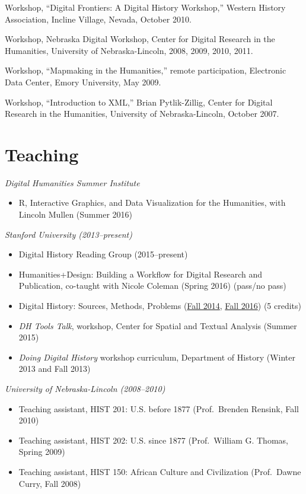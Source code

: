 Workshop, ``Digital Frontiers: A Digital History Workshop,'' Western
History Association, Incline Village, Nevada, October 2010.

Workshop, Nebraska Digital Workshop, Center for Digital Research in the
Humanities, University of Nebraska-Lincoln, 2008, 2009, 2010, 2011.

Workshop, ``Mapmaking in the Humanities,'' remote participation,
Electronic Data Center, Emory University, May 2009.

Workshop, ``Introduction to XML,'' Brian Pytlik-Zillig, Center for
Digital Research in the Humanities, University of Nebraska-Lincoln,
October 2007.

\section{Teaching}\label{teaching}

\emph{Digital Humanities Summer Institute}

\begin{itemize}
\tightlist
\item
  R, Interactive Graphics, and Data Visualization for the Humanities,
  with Lincoln Mullen (Summer 2016)
\end{itemize}

\emph{Stanford University (2013--present)}

\begin{itemize}
\tightlist
\item
  Digital History Reading Group (2015--present)
\item
  Humanities+Design: Building a Workflow for Digital Research and
  Publication, co-taught with Nicole Coleman (Spring 2016) (pass/no
  pass)
\item
  Digital History: Sources, Methods, Problems
  (\href{http://jasonheppler.org/teaching/hist205f.2014/}{Fall 2014},
  \href{}{Fall 2016}) (5 credits)
\item
  \emph{DH Tools Talk}, workshop, Center for Spatial and Textual
  Analysis (Summer 2015)
\item
  \emph{Doing Digital History} workshop curriculum, Department of
  History (Winter 2013 and Fall 2013)
\end{itemize}

\newpage

\emph{University of Nebraska-Lincoln (2008--2010)}

\begin{itemize}
\tightlist
\item
  Teaching assistant, HIST 201: U.S. before 1877 (Prof.~Brenden Rensink,
  Fall 2010)
\item
  Teaching assistant, HIST 202: U.S. since 1877 (Prof.~William G.
  Thomas, Spring 2009)
\item
  Teaching assistant, HIST 150: African Culture and Civilization
  (Prof.~Dawne Curry, Fall 2008)
\end{itemize}

